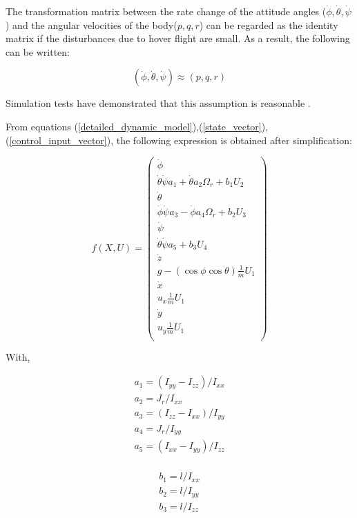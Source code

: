 \documentclass{thesisreport}
\begin{document}
The transformation matrix between the rate change of the attitude angles ($\dot{\phi},\dot{\theta},\dot{\psi}$) and the angular velocities of the body($p,q,r$) can be regarded as the identity matrix if the disturbances due to hover flight are small. As a result, the following can be written:

\begin{equation}
(\dot{\phi},\dot{\theta},\dot{\psi})  \approx (p,q,r)
\end{equation}

Simulation tests have demonstrated that this assumption is reasonable \cite{Bouabdalla2007}. 

\newpage

From equations (\ref{detailed_dynamic_model}),(\ref{state_vector}),(\ref{control_input_vector}), the following expression is obtained after simplification:

\begin{equation}\label{state_space_model}
f(X,U) = \begin{pmatrix}
\dot{\phi}\\
\dot{\theta} \dot{\psi} a_1 + \dot{\theta} a_2 \Omega_r + b_1 U_2 \\
\dot{\theta}\\
\dot{\phi} \dot{\psi} a_3 - \dot{\phi} a_4 \Omega_r + b_2 U_3 \\
\dot{\psi}\\
\dot{\theta} \dot{\psi} a_5 + b_3 U_4 \\
\dot{z}\\
g - (\cos \phi \cos \theta) \frac{1}{m} U_1 \\
\dot{x} \\
u_x \frac{1}{m} U_1\\
\dot{y}\\
u_y \frac{1}{m}U_1\\
\end{pmatrix}
\end{equation}

With, 

\begin{multicols}{2}
 
\begin{equation*}
\begin{aligned}
a_1 = (I_{yy} - I_{zz})/I_{xx}\\
a_2 = J_r/I_{xx}\\
a_3 = (I_{zz} - I_{xx})/I_{yy}\\
a_4 = J_r/I_{yy}\\
a_5 = (I_{xx} - I_{yy})/I_{zz}\\
\end{aligned}
\end{equation*}

\columnbreak

\begin{equation}
\begin{aligned}
b_1 = l/I_{xx}\\
b_2 =l/I_{yy}\\
b_3 = l/I_{zz}\\
\end{aligned}
\end{equation}

\end{multicols}
\end{document}
